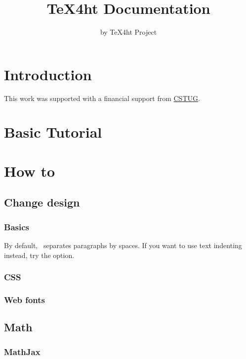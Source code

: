 \documentclass{book}
\title{TeX4ht Documentation}
\author{by TeX4ht Project}
\begin{document}
\maketitle

\ifdefined\HCode\else\tableofcontents\fi


\chapter{Introduction}


\begin{acknowledgements}
This work was supported with a financial support from \href{https://cstug.cz/}{CSTUG}.
\end{acknowledgements}

\chapter{Basic Tutorial}

\chapter{How to}

\section{Change design}
\subsection{Basics}

By default, \texfourht\ separates paragraphs by spaces. If you want to use text indenting instead, try the  option.

\subsection{CSS}
\subsection{Web fonts}

\section{Math}

\subsection{MathJax}
\end{document}
